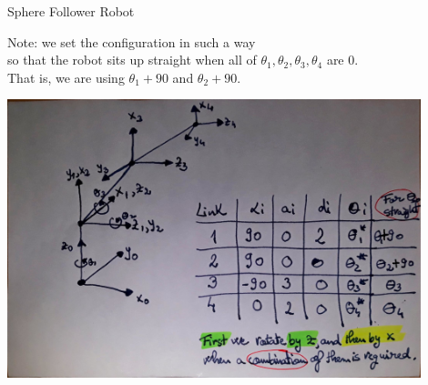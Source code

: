 \documentclass{article}
\begin{document}
	
\begin{center}
	{\Large Sphere Follower Robot}
\end{center}

\begin{center}
	{\large Note: we set the configuration in such a way \\
		so that the robot sits up straight when all of $\theta_{1}, \theta_{2}, \theta_{3}, \theta_{4}$ are 0. \\ That is, we are using $\theta_{1}+90$ and $ \theta_{2}+90$.}
\end{center}

\begin{center}
	\includegraphics[width=0.9\textwidth]{Configuration}
\end{center}

\newpage
\end{document}
